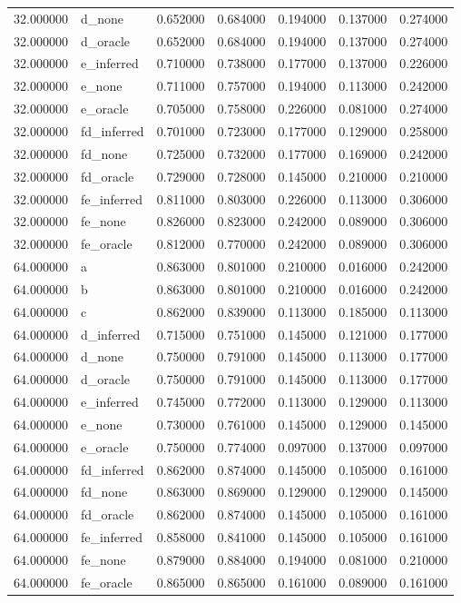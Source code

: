 \begin{tabular}{rlrrrrr}
32.000000 & d\_none & 0.652000 & 0.684000 & 0.194000 & 0.137000 & 0.274000 \\
32.000000 & d\_oracle & 0.652000 & 0.684000 & 0.194000 & 0.137000 & 0.274000 \\
32.000000 & e\_inferred & 0.710000 & 0.738000 & 0.177000 & 0.137000 & 0.226000 \\
32.000000 & e\_none & 0.711000 & 0.757000 & 0.194000 & 0.113000 & 0.242000 \\
32.000000 & e\_oracle & 0.705000 & 0.758000 & 0.226000 & 0.081000 & 0.274000 \\
32.000000 & fd\_inferred & 0.701000 & 0.723000 & 0.177000 & 0.129000 & 0.258000 \\
32.000000 & fd\_none & 0.725000 & 0.732000 & 0.177000 & 0.169000 & 0.242000 \\
32.000000 & fd\_oracle & 0.729000 & 0.728000 & 0.145000 & 0.210000 & 0.210000 \\
32.000000 & fe\_inferred & 0.811000 & 0.803000 & 0.226000 & 0.113000 & 0.306000 \\
32.000000 & fe\_none & 0.826000 & 0.823000 & 0.242000 & 0.089000 & 0.306000 \\
32.000000 & fe\_oracle & 0.812000 & 0.770000 & 0.242000 & 0.089000 & 0.306000 \\
64.000000 & a & 0.863000 & 0.801000 & 0.210000 & 0.016000 & 0.242000 \\
64.000000 & b & 0.863000 & 0.801000 & 0.210000 & 0.016000 & 0.242000 \\
64.000000 & c & 0.862000 & 0.839000 & 0.113000 & 0.185000 & 0.113000 \\
64.000000 & d\_inferred & 0.715000 & 0.751000 & 0.145000 & 0.121000 & 0.177000 \\
64.000000 & d\_none & 0.750000 & 0.791000 & 0.145000 & 0.113000 & 0.177000 \\
64.000000 & d\_oracle & 0.750000 & 0.791000 & 0.145000 & 0.113000 & 0.177000 \\
64.000000 & e\_inferred & 0.745000 & 0.772000 & 0.113000 & 0.129000 & 0.113000 \\
64.000000 & e\_none & 0.730000 & 0.761000 & 0.145000 & 0.129000 & 0.145000 \\
64.000000 & e\_oracle & 0.750000 & 0.774000 & 0.097000 & 0.137000 & 0.097000 \\
64.000000 & fd\_inferred & 0.862000 & 0.874000 & 0.145000 & 0.105000 & 0.161000 \\
64.000000 & fd\_none & 0.863000 & 0.869000 & 0.129000 & 0.129000 & 0.145000 \\
64.000000 & fd\_oracle & 0.862000 & 0.874000 & 0.145000 & 0.105000 & 0.161000 \\
64.000000 & fe\_inferred & 0.858000 & 0.841000 & 0.145000 & 0.105000 & 0.161000 \\
64.000000 & fe\_none & 0.879000 & 0.884000 & 0.194000 & 0.081000 & 0.210000 \\
64.000000 & fe\_oracle & 0.865000 & 0.865000 & 0.161000 & 0.089000 & 0.161000 \\
\bottomrule
\end{tabular}

